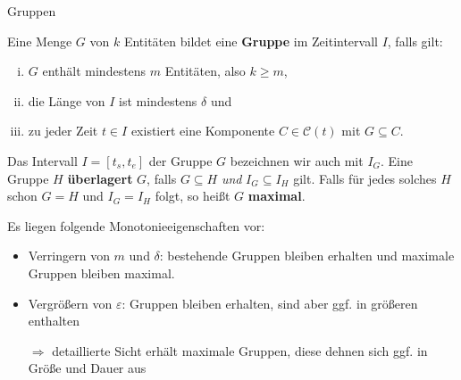 \documentclass[
wide,
10pt,
xcolor={x11names,svgnames},
hyperref={pdfauthor={Jannes Bantje},colorlinks,urlcolor=maincolor,hidelinks=false,linkcolor=maincolor},
pantone312, 	%
euler-digits,
]{beamer}
\newcommand{\Index}[1]{\bet{#1}}
\newcommand{\bet}[1]{\textbf{\color{maincolor}#1}}
\theoremstyle{definition}
\begin{document}
\begin{frame}{Gruppen}
    \begin{definition}[Gruppe]
    	Eine Menge $G$ von $k$ Entitäten bildet eine \Index{Gruppe} im Zeitintervall $I$, falls gilt:
    	\begin{enumerate}[(i)]
    		\item $G$ enthält mindestens $m$ Entitäten, also $k \ge m$,
    		\item die Länge von $I$ ist mindestens $\delta$ und
    		\item zu jeder Zeit $t \in I$ existiert eine Komponente $C \in \mathcal{C}(t)$ mit $G \subseteq C$.
    	\end{enumerate}
    	Das Intervall $I=[t_s,t_e]$ der Gruppe $G$ bezeichnen wir auch mit $I_G$.
    	Eine Gruppe $H$ \bet{überlagert} $G$, falls $G \subseteq H$ \emph{und} $I_G \subseteq I_H$ gilt.
    	Falls für jedes solches $H$ schon $G=H$ und $I_G=I_H$ folgt, so heißt $G$ \bet{maximal}.
    \end{definition}\pause
    Es liegen folgende Monotonieeigenschaften vor:\pause
    \begin{itemize}[<+->]
        \item Verringern von $m$ und $\delta$: bestehende Gruppen bleiben erhalten und maximale Gruppen bleiben maximal.
        \item Vergrößern von $\varepsilon$:
        Gruppen bleiben erhalten, sind aber ggf. in größeren enthalten
        \item[$\Rightarrow$] detaillierte Sicht erhält maximale Gruppen, diese dehnen sich ggf. in Größe und Dauer aus
    \end{itemize}
\end{frame}
\end{document}
